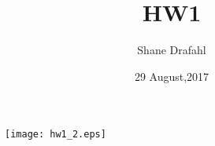 \documentclass[11pt]{article}
\title{HW1}
\author{Shane Drafahl}
\date{29 August,2017}
\begin{document}
    \maketitle

    

    \begin{figure}[!htb]
        \centering
        \texttt{[image: hw1\_2.eps]}
    \end{figure}

    
\end{document}
